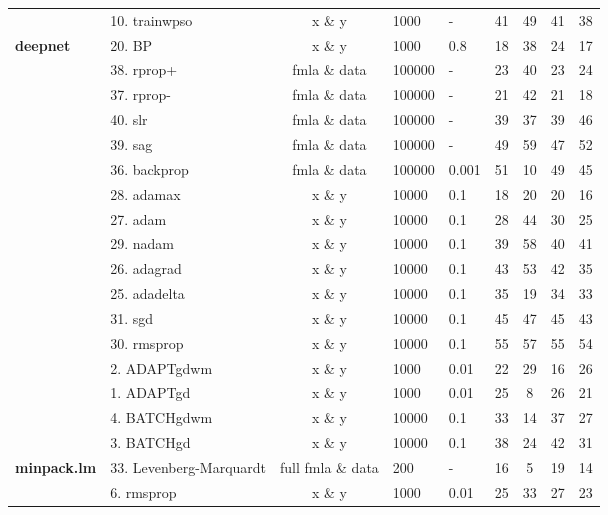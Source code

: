 \begin{Schunk}
\begin{table}
\begin{tabular}[t]{>{\bfseries}llcllcccc}
\multirow{-3}{*}{\raggedright\arraybackslash automl} & 10. trainwpso & x \& y & 1000 & - & 41 & 49 & 41 & 38\\
\cmidrule{1-9}
deepnet & 20. BP & x \& y & 1000 & 0.8 & 18 & 38 & 24 & 17\\
\cmidrule{1-9}
 & 38. rprop+ & fmla \& data & 100000 & - & 23 & 40 & 23 & 24\\

 & 37. rprop- & fmla \& data & 100000 & - & 21 & 42 & 21 & 18\\

 & 40. slr & fmla \& data & 100000 & - & 39 & 37 & 39 & 46\\

 & 39. sag & fmla \& data & 100000 & - & 49 & 59 & 47 & 52\\

\multirow{-5}{*}{\raggedright\arraybackslash neuralnet} & 36. backprop & fmla \& data & 100000 & 0.001 & 51 & 10 & 49 & 45\\
\cmidrule{1-9}
 & 28. adamax & x \& y & 10000 & 0.1 & 18 & 20 & 20 & 16\\

 & 27. adam & x \& y & 10000 & 0.1 & 28 & 44 & 30 & 25\\

 & 29. nadam & x \& y & 10000 & 0.1 & 39 & 58 & 40 & 41\\

 & 26. adagrad & x \& y & 10000 & 0.1 & 43 & 53 & 42 & 35\\

 & 25. adadelta & x \& y & 10000 & 0.1 & 35 & 19 & 34 & 33\\

 & 31. sgd & x \& y & 10000 & 0.1 & 45 & 47 & 45 & 43\\

\multirow{-7}{*}{\raggedright\arraybackslash keras} & 30. rmsprop & x \& y & 10000 & 0.1 & 55 & 57 & 55 & 54\\
\cmidrule{1-9}
 & 2. ADAPTgdwm & x \& y & 1000 & 0.01 & 22 & 29 & 16 & 26\\

 & 1. ADAPTgd & x \& y & 1000 & 0.01 & 25 & 8 & 26 & 21\\

 & 4. BATCHgdwm & x \& y & 10000 & 0.1 & 33 & 14 & 37 & 27\\

\multirow{-4}{*}{\raggedright\arraybackslash AMORE} & 3. BATCHgd & x \& y & 10000 & 0.1 & 38 & 24 & 42 & 31\\
\cmidrule{1-9}
minpack.lm & 33. Levenberg-Marquardt & full fmla \& data & 200 & - & 16 & 5 & 19 & 14\\
\cmidrule{1-9}
 & 6. rmsprop & x \& y & 1000 & 0.01 & 25 & 33 & 27 & 23\\


\end{tabular}
\end{table}
\end{Schunk}
